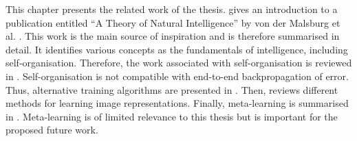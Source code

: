 This chapter presents the related work of the thesis.  gives an introduction to a publication entitled ``A Theory of Natural Intelligence'' by von der Malsburg et al. \cite{von_der_Malsburg_Stadelmann_Grewe_2022}. This work is the main source of inspiration and is therefore summarised in detail. It identifies various concepts as the fundamentals of intelligence, including self-organisation. Therefore, the work associated with self-organisation is reviewed in . Self-organisation is not compatible with end-to-end backpropagation of error. Thus, alternative training algorithms are presented in . Then,  reviews different methods for learning image representations. Finally, meta-learning is summarised in . Meta-learning is of limited relevance to this thesis but is important for the proposed future work.

